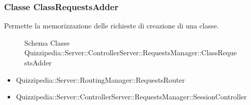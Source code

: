 \subsubsection{Classe ClassRequestsAdder}
Permette la memorizzazione delle richieste di creazione di una classe.
\begin{figure}[H]
\centering
\noindent{}
\caption[Schema Classe ClassRequestsAdder]{Schema Classe Quizzipedia::Server::ControllerServer::RequestsManager::ClassRequestsAdder}
\end{figure}
\begin{itemize}
\item Quizzipedia::Server::RoutingManager::RequestsRouter
\end{itemize}
\begin{itemize}
\item Quizzipedia::Server::ControllerServer::RequestsManager::SessionController
\end{itemize}
